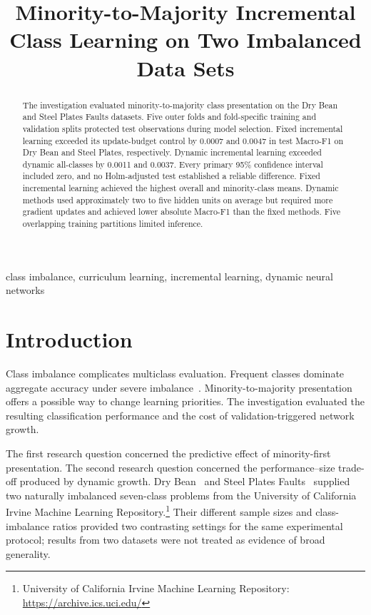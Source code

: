 \documentclass[conference,10pt]{IEEEtran}
\title{Minority-to-Majority Incremental Class Learning on Two Imbalanced Data Sets}
\author{\IEEEauthorblockN{JW Moolman}
\IEEEauthorblockA{Student number: 26892154\\
Stellenbosch Department of Computer Science\\Module: RW741\\
Repository: \url{PLACEHOLDER HTTPS REPOSITORY URL}}}
\begin{document}
\maketitle

\begin{abstract}
The investigation evaluated minority-to-majority class presentation on the Dry Bean and Steel Plates Faults datasets. Five outer folds and fold-specific training and validation splits protected test observations during model selection. Fixed incremental learning exceeded its update-budget control by 0.0007 and 0.0047 in test Macro-F1 on Dry Bean and Steel Plates, respectively. Dynamic incremental learning exceeded dynamic all-classes by 0.0011 and 0.0037. Every primary 95\% confidence interval included zero, and no Holm-adjusted test established a reliable difference. Fixed incremental learning achieved the highest overall and minority-class means. Dynamic methods used approximately two to five hidden units on average but required more gradient updates and achieved lower absolute Macro-F1 than the fixed methods. Five overlapping training partitions limited inference.
\end{abstract}
\begin{IEEEkeywords}class imbalance, curriculum learning, incremental learning, dynamic neural networks\end{IEEEkeywords}

\section{Introduction}
Class imbalance complicates multiclass evaluation. Frequent classes dominate aggregate accuracy under severe imbalance~\cite{he2009learning}. Minority-to-majority presentation offers a possible way to change learning priorities. The investigation evaluated the resulting classification performance and the cost of validation-triggered network growth.

The first research question concerned the predictive effect of minority-first presentation. The second research question concerned the performance--size trade-off produced by dynamic growth. Dry Bean~\cite{koklu2020multiclass} and Steel Plates Faults~\cite{buscema2010steel} supplied two naturally imbalanced seven-class problems from the University of California Irvine Machine Learning Repository.\footnote{University of California Irvine Machine Learning Repository: \url{https://archive.ics.uci.edu/}} Their different sample sizes and class-imbalance ratios provided two contrasting settings for the same experimental protocol; results from two datasets were not treated as evidence of broad generality.
\end{document}
